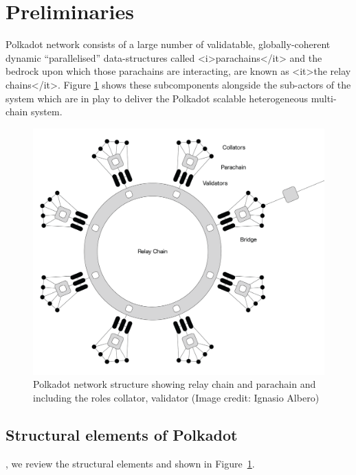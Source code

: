 \section{Preliminaries}\label{sec:preliminiary}
Polkadot network consists of a large number of validatable, globally-coherent dynamic “parallelised” data-structures called  <i>parachains</it> and the bedrock upon which those parachains are interacting, are known as <it>the relay chains</it>. Figure \ref{fig:roles} shows these subcomponents alongside the sub-actors of the system which are in play to deliver the Polkadot scalable heterogeneous multi-chain system.

\begin{figure}[h]
	\centering
	\includegraphics[width=.7\textwidth]{images/Network@2x.png}
	\caption{Polkadot network structure showing relay chain and parachain and including the roles collator, validator (Image credit: Ignasio Albero)}
	\label{fig:roles}
\end{figure}
\subsection{Structural elements of Polkadot}
, we review the structural elements and  shown in Figure~\ref{fig:roles}.

